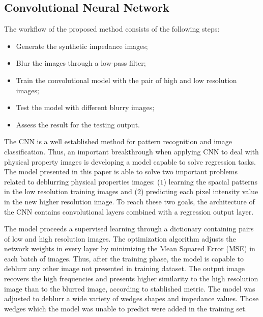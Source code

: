 \documentclass[conference,compsoc]{IEEEtran}
\begin{document}
\subsection{Convolutional Neural Network}
The workflow of the proposed method consists of the following
steps:
\begin{itemize}
 \item Generate the synthetic impedance images;
 \item Blur the images through a low-pass filter;
 \item Train the convolutional model with the pair of high and low resolution images;
 \item Test the model with different blurry images;
 \item Assess the result for the testing output.
\end{itemize}

The CNN is a well established method for
pattern recognition and image classification.
Thus, an important breakthrough when applying CNN to
deal with physical property images is developing a model
capable to solve regression tasks. The model presented in this paper
is able to solve two important problems related to deblurring physical properties
images: ($1$) learning the spacial patterns in the low resolution
training images and ($2$) predicting each pixel intensity value in the new
higher resolution image. To reach these two goals, the architecture of the
CNN contains convolutional layers combined with a regression output
layer.

The model proceeds a supervised learning through a dictionary containing pairs of low
and high resolution images. The optimization algorithm adjusts the 
network weights in every layer by minimizing the Mean Squared Error (MSE)
in each batch of images. Thus, after the training phase, the model is capable
to deblurr any other image not presented in training dataset. The output
image recovers the high frequencies and presents higher similarity
to the high resolution image than to the blurred image, according to stablished metric.
The model was adjusted to deblurr a wide variety
of wedges shapes and impedance values. Those wedges which the model was unable
to predict were added in the training set.
\end{document}

